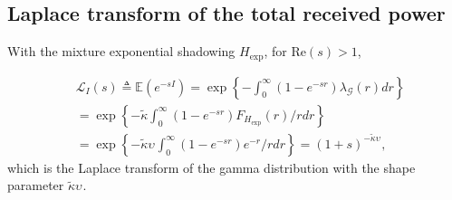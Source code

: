 \documentclass[lettersize,journal]{IEEEtran}
\begin{document}





\subsection{Laplace transform of the total received power}

With the mixture exponential shadowing ${H}_{\text{exp}}$, for Re$(s)>1$,

\begin{align}
  \label{eq:lapdef}
  &\mathcal{L}_{I}(s)\triangleq \mathbb{E}\left(e^{-sI}\right)= \exp\left\{-\int_0^{\infty}(1-e^{-sr}) \lambda_{\mathcal{G}}(r) dr \right\} \nonumber \\
  &=\exp\left\{-\tilde{\kappa}\int_0^{\infty}(1-e^{-sr}) F_{{H}_{\text{exp}}}(r) /r dr \right\} \nonumber \\
  &=\exp\left\{-\tilde{\kappa}\upsilon_{}\int_0^{\infty}(1-e^{-sr}) e^{-r} /r dr \right\} =(1+s)^{-\tilde{\kappa}\upsilon_{}},
\end{align}
which is the Laplace transform of the gamma distribution with the shape parameter $\tilde{\kappa}\upsilon_{}$. 
\end{document}
